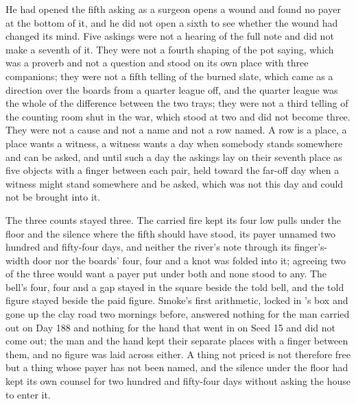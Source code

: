 He had opened the fifth asking as a surgeon opens a wound and found no payer at the bottom of it, and he did not open a sixth to see whether the wound had changed its mind. Five askings were not a hearing of the full note and did not make a seventh of it. They were not a fourth shaping of the pot saying, which was a proverb and not a question and stood on its own place with three companions; they were not a fifth telling of the burned slate, which came as a direction over the boards from a quarter league off, and the quarter league was the whole of the difference between the two trays; they were not a third telling of the counting room shut in the war, which stood at two and did not become three. They were not a cause and not a name and not a row named. A row is a place, a place wants a witness, a witness wants a day when somebody stands somewhere and can be asked, and until such a day the askings lay on their seventh place as five objects with a finger between each pair, held toward the far-off day when a witness might stand somewhere and be asked, which was not this day and could not be brought into it.

The three counts stayed three. The carried fire kept its four low pulls under the floor and the silence where the fifth should have stood, its payer unnamed two hundred and fifty-four days, and neither the river's note through its finger's-width door nor the boards' four, four and a knot was folded into it; agreeing two of the three would want a payer put under both and none stood to any. The bell's four, four and a gap stayed in the square beside the told bell, and the told figure stayed beside the paid figure. Smoke's first arithmetic, locked in 's box and gone up the clay road two mornings before, answered nothing for the man carried out on Day 188 and nothing for the hand that went in on Seed 15 and did not come out; the man and the hand kept their separate places with a finger between them, and no figure was laid across either. A thing not priced is not therefore free but a thing whose payer has not been named, and the silence under the floor had kept its own counsel for two hundred and fifty-four days without asking the house to enter it.

\scenebreak

